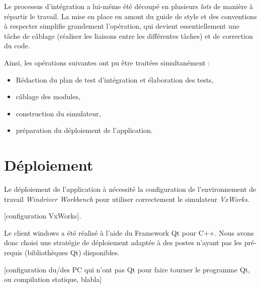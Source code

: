 Le processus d'intégration a lui-même été découpé en plusieurs \textit{lots} de
manière à répartir le travail. La mise en place en amont du guide de style et
des conventions à respecter simplifie grandement l'opération, qui devient
essentiellement une tâche de câblage (réaliser les liaisons entre les
différentes tâches) et de correction du code.

Ainsi, les opérations suivantes ont pu être traitées simultanément :

\begin{itemize}
	\item Rédaction du plan de test d'intégration et élaboration des tests,
	\item câblage des modules,
	\item construction du simulateur,
	\item préparation du déploiement de l'application.
\end{itemize}

\section{Déploiement}

Le déploiement de l'application à nécessité la configuration de l'environnement
de travail \textit{Windriver Workbench} pour utiliser correctement le
simulateur \textit{VxWorks}.

[configuration VxWorks].

Le client windows a été réalisé à l'aide du Framework Qt pour C++. Nous avons
donc choisi une stratégie de déploiement adaptée à des postes n'ayant pas les pré-requis (bibliothèques Qt) disponibles.

[configuration du/des PC qui n'ont pas Qt pour faire tourner le programme Qt, ou compilation statique, blabla]
